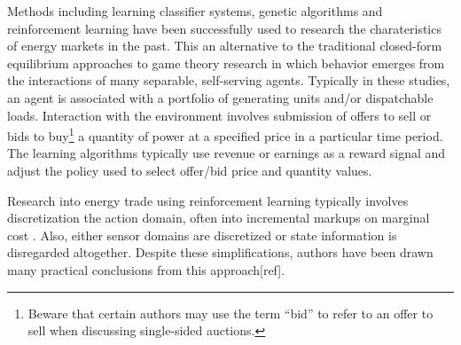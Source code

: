 

Methods including learning classifier systems, genetic algorithms and
reinforcement learning have been successfully used to research the
charateristics of energy markets in the past\cite{anke:2008}.  This an
alternative to the traditional closed-form equilibrium approaches to game
theory research in which behavior emerges from the interactions of many
separable, self-serving agents. Typically in these studies, an agent is
associated with a portfolio of generating units and/or dispatchable
loads. Interaction with the environment involves submission of offers to sell
or bids to buy\footnote{Beware that certain authors may use the term ``bid''
to refer to an offer to sell when discussing single-sided auctions.} a
quantity of power at a specified price in a particular time period.  The
learning algorithms typically use revenue or earnings as a reward signal and
adjust the policy used to select offer/bid price and quantity values.

Research into energy trade using reinforcement learning typically
involves discretization the action domain, often into incremental markups
on marginal cost \cite{anke:2008}. Also, either sensor domains are discretized
or state information is disregarded altogether.  Despite these simplifications,
authors have been drawn many practical conclusions from this approach[ref].

